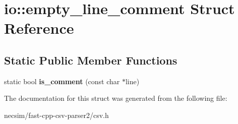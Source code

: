 \hypertarget{structio_1_1empty__line__comment}{}\section{io\+:\+:empty\+\_\+line\+\_\+comment Struct Reference}
\label{structio_1_1empty__line__comment}
\subsection*{Static Public Member Functions}
\begin{DoxyCompactItemize}
\item 
static bool {\bfseries is\+\_\+comment} (const char $\ast$line)\hypertarget{structio_1_1empty__line__comment_a88e2cee044a9aafabf3e2a0e64fa5289}{}\label{structio_1_1empty__line__comment_a88e2cee044a9aafabf3e2a0e64fa5289}

\end{DoxyCompactItemize}


The documentation for this struct was generated from the following file\+:\begin{DoxyCompactItemize}
\item 
necsim/fast-\/cpp-\/csv-\/parser2/csv.\+h\end{DoxyCompactItemize}
